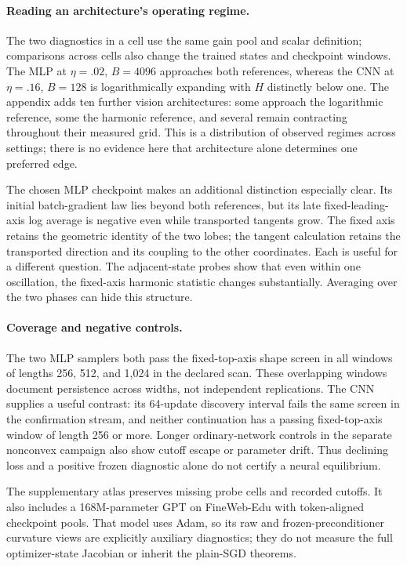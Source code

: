 \paragraph{Reading an architecture's operating regime.}
The two diagnostics in a cell use the same gain pool and scalar definition; comparisons across cells also change the trained states and checkpoint windows. The MLP at $\eta=.02$, $B=4096$ approaches both references, whereas the CNN at $\eta=.16$, $B=128$ is logarithmically expanding with $H$ distinctly below one. The appendix adds ten further vision architectures: some approach the logarithmic reference, some the harmonic reference, and several remain contracting throughout their measured grid. This is a distribution of observed regimes across settings; there is no evidence here that architecture alone determines one preferred edge.

The chosen MLP checkpoint makes an additional distinction especially clear. Its initial batch-gradient law lies beyond both references, but its late fixed-leading-axis log average is negative even while transported tangents grow. The fixed axis retains the geometric identity of the two lobes; the tangent calculation retains the transported direction and its coupling to the other coordinates. Each is useful for a different question. The adjacent-state probes show that even within one oscillation, the fixed-axis harmonic statistic changes substantially. Averaging over the two phases can hide this structure.

\paragraph{Coverage and negative controls.}
The two MLP samplers both pass the fixed-top-axis shape screen in all windows of lengths 256, 512, and 1,024 in the declared scan. These overlapping windows document persistence across widths, not independent replications. The CNN supplies a useful contrast: its 64-update discovery interval fails the same screen in the confirmation stream, and neither continuation has a passing fixed-top-axis window of length 256 or more. Longer ordinary-network controls in the separate nonconvex campaign also show cutoff escape or parameter drift. Thus declining loss and a positive frozen diagnostic alone do not certify a neural equilibrium.

The supplementary atlas preserves missing probe cells and recorded cutoffs. It also includes a 168M-parameter GPT on FineWeb-Edu with token-aligned checkpoint pools. That model uses Adam, so its raw and frozen-preconditioner curvature views are explicitly auxiliary diagnostics; they do not measure the full optimizer-state Jacobian or inherit the plain-SGD theorems.
